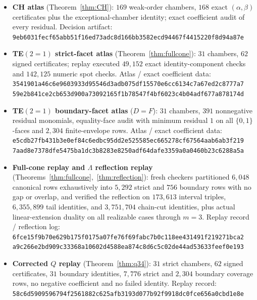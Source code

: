 \documentclass[11pt]{article}
\theoremstyle{definition}
\theoremstyle{remark}
\begin{document}
\begin{itemize}
\item[(i)] \textbf{CH atlas} (Theorem~\ref{thm:CH}): $169$ weak-order chambers, $168$
exact $(\alpha,\beta)$ certificates plus the exceptional-chamber identity; exact
coefficient audit of every residual. Decision artifact:\\
{\footnotesize\texttt{9eb6031fecf65abb51f16ed73adc8d166bb3582ecd94467f4415220f8d94a87e}}
\item[(ii)] \textbf{TE$(2{=}1)$ strict-facet atlas} (Theorem~\ref{thm:fullcone}): $31$
chambers, $62$ signed certificates; replay executed $49{,}152$ exact identity-component
checks and $142{,}125$ numeric spot checks. Atlas / exact coefficient data:\\
{\footnotesize\texttt{3541901a46c6e9603933d95546d3adb075df15570e6cc6134c7a67ed2c8777a7}}\\
{\footnotesize\texttt{59e2b841ce2cb653d900a73092165f1b78547f4bf6023c4b04adf677a878174d}}
\item[(iii)] \textbf{TE$(2{=}1)$ boundary-facet atlas} ($D{=}F$): $31$ chambers, $391$
nonnegative residual monomials, equality-face audit with minimum residual $1$ on all
$\{0,1\}$-faces and $2{,}304$ finite-envelope rows. Atlas / exact coefficient data:\\
{\footnotesize\texttt{e5cdb27fb431b3e0ef84c6edbc95dd2e525585ec665278cf67564aab6ab3f219}}\\
{\footnotesize\texttt{7aad8e7378dfe5475ba1dc3b8283e8250adf64dafe3359a0a0460b23c6288a5a}}
\item[(iv)] \textbf{Full-cone replay and $\Lambda$ reflection replay}
(Theorems~\ref{thm:fullcone},~\ref{thm:reflection}): fresh checkers partitioned $6{,}048$
canonical rows exhaustively into $5{,}292$ strict and $756$ boundary rows with no gap or
overlap, and verified the reflection on $173{,}613$ interval triples, $6{,}355{,}899$
tail identities, and $3{,}751{,}704$ chain-cut identities, plus actual linear-extension
duality on all realizable cases through $m=3$. Replay record / reflection log:\\
{\footnotesize\texttt{6fce15f9b70e629b175f0175a07fe76f69fabc7b0c118ee431491f219271bca2}}\\
{\footnotesize\texttt{a9c266e2bd909c33368a10602d4588ea874c8d6c5c02de44ad53633feef0e193}}
\item[(v)] \textbf{Corrected $Q$ replay} (Theorem~\ref{thm:q34}): $31$ strict chambers,
$62$ signed certificates, $31$ boundary identities, $7{,}776$ strict and $2{,}304$
boundary coverage rows, no negative coefficient and no failed identity. Replay record:\\
{\footnotesize\texttt{58c6d5909596794f2561882c625afb3193d077b92f9918dc0fce656a0cbd1e8e}}
\end{itemize}
\end{document}
